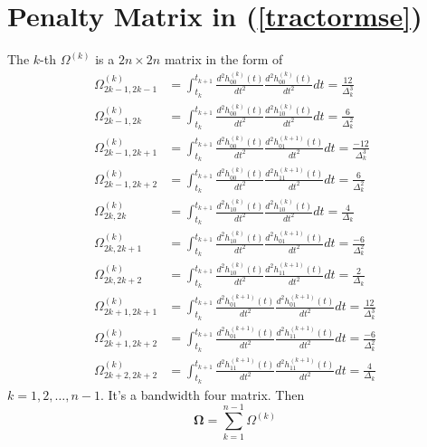 


\section{Penalty Matrix in (\ref{tractormse})}\label{PenaltyTermDetails}


The $k$-th $\Omega^{(k)}$ is a $2n \times 2n$ matrix in the form of
\begin{align}
\Omega_{2k-1,2k-1}^{(k)} & =\int_{t_{k}}^{t_{k+1}} \frac{d^2 h_{00}^{(k)}(t)}{dt^2}  \frac{d^2 h_{00}^{(k)}(t)}{dt^2} dt=\frac{12}{\Delta_k^3}\\
\Omega_{2k-1,2k}^{(k)} &=\int_{t_{k}}^{t_{k+1}} \frac{d^2 h_{00}^{(k)}(t)}{dt^2}  \frac{d^2 h_{10}^{(k)}(t)}{dt^2} dt=\frac{6}{\Delta_k^2}\\
\Omega_{2k-1,2k+1}^{(k)} &=\int_{t_{k}}^{t_{k+1}} \frac{d^2 h_{00}^{(k)}(t)}{dt^2}  \frac{d^2 h_{01}^{(k+1)}(t)}{dt^2} dt=\frac{-12}{\Delta_k^3}\\
\Omega_{2k-1,2k+2}^{(k)} &=\int_{t_{k}}^{t_{k+1}} \frac{d^2 h_{00}^{(k)}(t)}{dt^2}  \frac{d^2 h_{11}^{(k+1)}(t)}{dt^2} dt=\frac{6}{\Delta_k^2}\\
\Omega_{2k,2k}^{(k)} &=\int_{t_{k}}^{t_{k+1}} \frac{d^2 h_{10}^{(k)}(t)}{dt^2}  \frac{d^2 h_{10}^{(k)}(t)}{dt^2} dt=\frac{4}{\Delta_k} \\
\Omega_{2k,2k+1}^{(k)} &=\int_{t_{k}}^{t_{k+1}} \frac{d^2 h_{10}^{(k)}(t)}{dt^2}  \frac{d^2 h_{01}^{(k+1)}(t)}{dt^2} dt=\frac{-6}{\Delta_k^2}\\
\Omega_{2k,2k+2}^{(k)} &=\int_{t_{k}}^{t_{k+1}} \frac{d^2 h_{10}^{(k)}(t)}{dt^2}  \frac{d^2 h_{11}^{(k+1)}(t)}{dt^2} dt=\frac{2}{\Delta_k}\\
\Omega_{2k+1,2k+1}^{(k)} &=\int_{t_{k}}^{t_{k+1}} \frac{d^2 h_{01}^{(k+1)}(t)}{dt^2}  \frac{d^2 h_{01}^{(k+1)}(t)}{dt^2} dt=\frac{12}{\Delta_k^3}\\
\Omega_{2k+1,2k+2}^{(k)} &=\int_{t_{k}}^{t_{k+1}} \frac{d^2 h_{01}^{(k+1)}(t)}{dt^2}  \frac{d^2 h_{11}^{(k+1)}(t)}{dt^2} dt=\frac{-6}{\Delta_k^2}\\
\Omega_{2k+2,2k+2}^{(k)} &=\int_{t_{k}}^{t_{k+1}} \frac{d^2 h_{11}^{(k+1)}(t)}{dt^2}  \frac{d^2 h_{11}^{(k+1)}(t)}{dt^2} dt=\frac{4}{\Delta_k}
\end{align}
$k=1,2,\ldots,n-1$. It's a bandwidth four matrix. Then
\begin{equation*}
\mathbf{\Omega}=\sum_{k=1}^{n-1}\Omega^{(k)}
\end{equation*}


